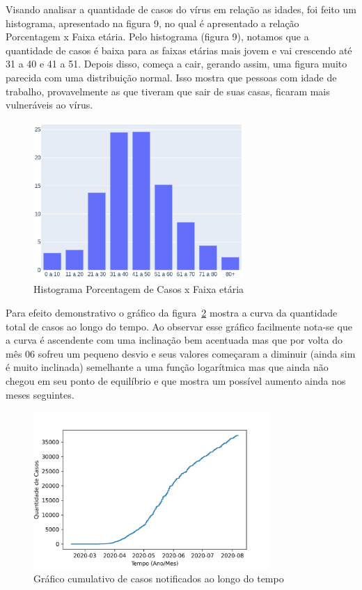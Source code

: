 Visando analisar a quantidade de casos do vírus em relação as idades, foi feito um histograma, apresentado na figura 9, no qual é apresentado a relação Porcentagem x Faixa etária. Pelo histograma (figura 9), notamos que a quantidade de casos é baixa para as faixas etárias mais jovem e vai crescendo até 31 a 40 e 41 a 51. Depois disso, começa a cair, gerando assim, uma figura muito parecida com uma distribuição normal. Isso mostra que pessoas com idade de trabalho, provavelmente as que tiveram que sair de suas casas, ficaram mais vulneráveis ao vírus.

\begin{figure}[!ht]
\centering
    \includegraphics[width=8cm]{img/procentagemporidade.png}
    \caption{Histograma Porcentagem de Casos x Faixa etária}
    \label{fig:uc7} %
\end{figure}

Para efeito demonstrativo o gráfico da figura~\ref{fig:uc8} mostra a curva da quantidade total de casos ao longo do tempo. Ao observar esse gráfico facilmente nota-se que a curva é ascendente com uma inclinação bem acentuada mas que por volta do mês 06 sofreu um pequeno desvio e seus valores começaram a diminuir (ainda sim é muito inclinada) semelhante a uma função logarítmica mas que ainda não chegou em seu ponto de equilíbrio e que mostra um possível aumento ainda nos meses seguintes.
\begin{figure}[!ht]
\centering
    \includegraphics[width=9cm]{img/distribuicao2.6.png}
    \caption{Gráfico cumulativo de casos notificados ao longo do tempo}
    \label{fig:uc8} %
\end{figure}

